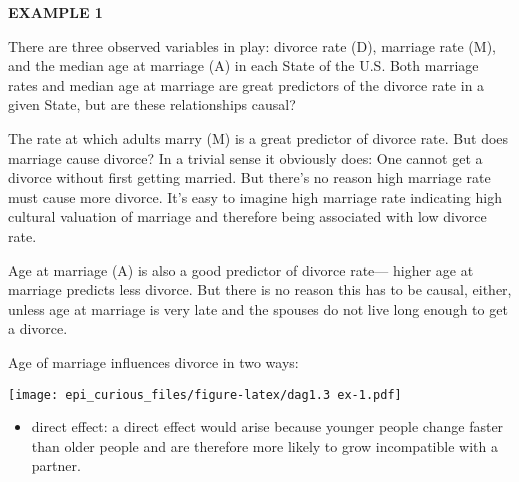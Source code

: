 \documentclass[
]{article}
\newenvironment{Shaded}{\begin{snugshade}}{\end{snugshade}}
\newcommand{\CommentTok}[1]{\textcolor[rgb]{0.56,0.35,0.01}{\textit{#1}}}
\newcommand{\KeywordTok}[1]{\textcolor[rgb]{0.13,0.29,0.53}{\textbf{#1}}}
\newcommand{\NormalTok}[1]{#1}
\newcommand{\OperatorTok}[1]{\textcolor[rgb]{0.81,0.36,0.00}{\textbf{#1}}}
\newcommand{\StringTok}[1]{\textcolor[rgb]{0.31,0.60,0.02}{#1}}
\providecommand{\tightlist}{%
  \setlength{\itemsep}{0pt}\setlength{\parskip}{0pt}}
\begin{document}
\begin{Shaded}
\end{Shaded}

\textbf{EXAMPLE 1}

There are three observed variables in play: divorce rate (D), marriage
rate (M), and the median age at marriage (A) in each State of the U.S.
Both marriage rates and median age at marriage are great predictors of
the divorce rate in a given State, but are these relationships causal?

The rate at which adults marry (M) is a great predictor of divorce rate.
But does marriage cause divorce? In a trivial sense it obviously does:
One cannot get a divorce without first getting married. But there's no
reason high marriage rate must cause more divorce. It's easy to imagine
high marriage rate indicating high cultural valuation of marriage and
therefore being associated with low divorce rate.

Age at marriage (A) is also a good predictor of divorce rate--- higher
age at marriage predicts less divorce. But there is no reason this has
to be causal, either, unless age at marriage is very late and the
spouses do not live long enough to get a divorce.

Age of marriage influences divorce in two ways:

\texttt{[image: epi\_curious\_files/figure-latex/dag1.3 ex-1.pdf]}

\begin{itemize}
\tightlist
\item
  direct effect: a direct effect would arise because younger people
  change faster than older people and are therefore more likely to grow
  incompatible with a partner.
\end{itemize}
\end{document}
